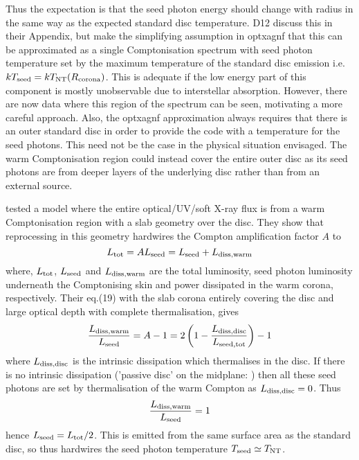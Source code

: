 \documentclass[a4paper,fleqn,usenatbib]{mnras}
\newcommand{\green}{\textcolor{green}}
\begin{document}
Thus the expectation is that the seed photon energy should change with
radius in the same way as the expected standard disc temperature.  D12
discuss this in their Appendix, but make the simplifying assumption in
{\sc optxagnf} that this can be approximated as a single
Comptonisation spectrum with seed photon temperature set by the
maximum temperature of the standard disc emission
i.e. $kT_{\rm seed}=kT_{\rm NT}(R_{\rm corona})$. This is adequate if the low energy
part of this component is mostly unobservable due to interstellar
absorption. However, there are now data where this region of the
spectrum can be seen, motivating a more careful approach.  Also, the
{\sc optxagnf} approximation always requires that there is an outer
standard disc in order to provide the code with a temperature for the
seed photons. This need not be the case in the physical situation
envisaged. The warm Comptonisation region could instead cover the
entire outer disc as its seed photons are from deeper layers of the
underlying disc rather than from an external
source. 

\cite{petrucci2017} tested a model where the entire
optical/UV/soft X-ray flux is from a warm Comptonisation region with a slab geometry over the disc. 
They show that reprocessing in this geometry hardwires the Compton amplification
factor $A$ to 
\[
L_{\rm tot}=AL_{\rm seed} =L_{\rm seed} +L_{\rm diss,warm}
\] 
where, $L_{\rm tot}$, $L_{\rm seed}$ and $L_{\rm diss, warm}$ are
the total luminosity, seed photon luminosity underneath the Comptonising skin and power dissipated in the warm corona, respectively.
Their eq.(19) with the slab corona entirely covering the disc and large
optical depth with complete thermalisation, gives
\[
\frac{L_{\rm diss,warm}}{L_{\rm seed}}=A-1=2\left(1-\frac{L_{\rm diss, disc}}{L_{\rm seed,tot}}\right)-1
\] 
where $L_{\rm diss,disc}$ is the intrinsic dissipation which
thermalises in the disc. If there is no intrinsic
dissipation ('passive disc' on the midplane: \citealt{petrucci2017,petrucci2013})
then all these seed photons are set by thermalisation of the warm
Compton as $L_{\rm diss, disc}=0$.
Thus  
\[
\frac{L_{\rm diss,warm}}{L_{\rm seed}}=1
\]
hence $L_{\rm seed}=L_{\rm tot}/2$. This is emitted from the same surface area as the standard disc, so thus hardwires the seed photon temperature $T_{\rm seed}\simeq T_{\rm NT}$.

\end{document}
